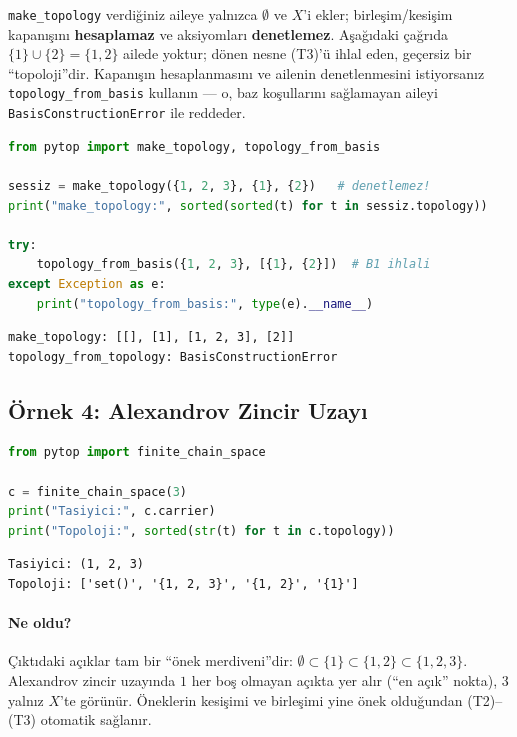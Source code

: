 \begin{dikkat}
\texttt{make\_topology} verdiğiniz aileye yalnızca $\emptyset$ ve $X$'i
ekler; birleşim/kesişim kapanışını \textbf{hesaplamaz} ve aksiyomları
\textbf{denetlemez}. Aşağıdaki çağrıda $\{1\}\cup\{2\}=\{1,2\}$ ailede
yoktur; dönen nesne (T3)'ü ihlal eden, geçersiz bir ``topoloji''dir.
Kapanışın hesaplanmasını ve ailenin denetlenmesini istiyorsanız
\texttt{topology\_from\_basis} kullanın --- o, baz koşullarını
sağlamayan aileyi \texttt{BasisConstructionError} ile reddeder.
\end{dikkat}

\begin{lstlisting}[language=Python, caption={Kapanış hesaplanmaz --- sorumluluk kullanıcıda}]
from pytop import make_topology, topology_from_basis

sessiz = make_topology({1, 2, 3}, {1}, {2})   # denetlemez!
print("make_topology:", sorted(sorted(t) for t in sessiz.topology))

try:
    topology_from_basis({1, 2, 3}, [{1}, {2}])  # B1 ihlali
except Exception as e:
    print("topology_from_basis:", type(e).__name__)
\end{lstlisting}

\begin{lstlisting}[style=output, caption={Çıktı}]
make_topology: [[], [1], [1, 2, 3], [2]]
topology_from_topology: BasisConstructionError
\end{lstlisting}

\subsection{Örnek 4: Alexandrov Zincir Uzayı}

\begin{lstlisting}[language=Python, caption={Zincir uzayı}]
from pytop import finite_chain_space

c = finite_chain_space(3)
print("Tasiyici:", c.carrier)
print("Topoloji:", sorted(str(t) for t in c.topology))
\end{lstlisting}

\begin{lstlisting}[caption={Çıktı}]
Tasiyici: (1, 2, 3)
Topoloji: ['set()', '{1, 2, 3}', '{1, 2}', '{1}']
\end{lstlisting}

\paragraph{Ne oldu?}
Çıktıdaki açıklar tam bir ``önek merdiveni''dir:
$\emptyset\subset\{1\}\subset\{1,2\}\subset\{1,2,3\}$. Alexandrov zincir
uzayında $1$ her boş olmayan açıkta yer alır (``en açık'' nokta), $3$
yalnız $X$'te görünür. Öneklerin kesişimi ve birleşimi yine önek
olduğundan (T2)--(T3) otomatik sağlanır.

